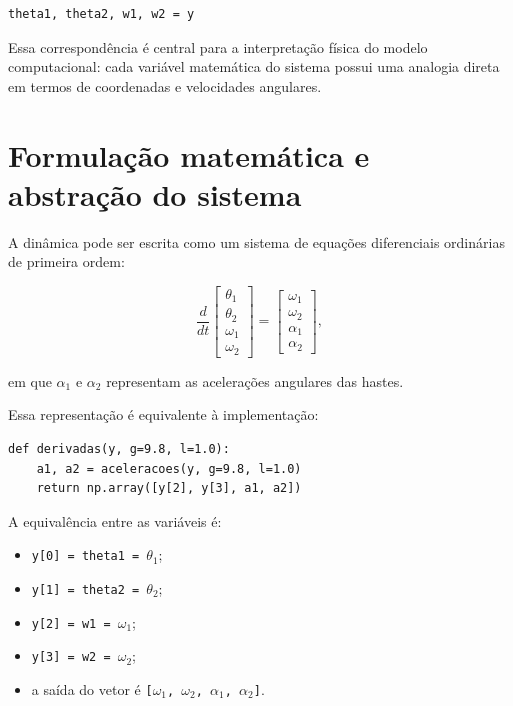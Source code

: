 \documentclass[12pt,a4paper]{article}
\begin{document}
\begin{lstlisting}
theta1, theta2, w1, w2 = y
\end{lstlisting}

Essa correspondência é central para a interpretação física do modelo computacional: cada variável matemática do sistema possui uma analogia direta em termos de coordenadas e velocidades angulares.

\section{Formulação matemática e abstração do sistema}

A dinâmica pode ser escrita como um sistema de equações diferenciais ordinárias de primeira ordem:

\begin{equation}
\frac{d}{dt}
\begin{bmatrix}
\theta_1 \\
\theta_2 \\
\omega_1 \\
\omega_2
\end{bmatrix}
=
\begin{bmatrix}
\omega_1 \\
\omega_2 \\
\alpha_1 \\
\alpha_2
\end{bmatrix},
\end{equation}

em que $\alpha_1$ e $\alpha_2$ representam as acelerações angulares das hastes.

Essa representação é equivalente à implementação:

\begin{lstlisting}
def derivadas(y, g=9.8, l=1.0):
    a1, a2 = aceleracoes(y, g=9.8, l=1.0)
    return np.array([y[2], y[3], a1, a2])
\end{lstlisting}

A equivalência entre as variáveis é:

\begin{itemize}
    \item \texttt{y[0] = theta1 = $\theta_1$};
    \item \texttt{y[1] = theta2 = $\theta_2$};
    \item \texttt{y[2] = w1 = $\omega_1$};
    \item \texttt{y[3] = w2 = $\omega_2$};
    \item a saída do vetor é \texttt{[$\omega_1$, $\omega_2$, $\alpha_1$, $\alpha_2$]}.
\end{itemize}
\end{document}
